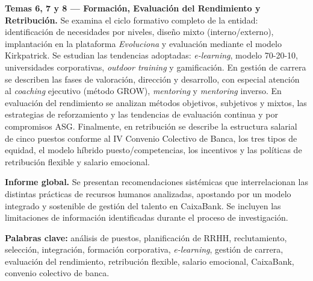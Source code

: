\textbf{Temas 6, 7 y 8 — Formación, Evaluación del Rendimiento y Retribución.}
Se examina el ciclo formativo completo de la entidad: identificación de necesidades
por niveles, diseño mixto (interno/externo), implantación en la plataforma
\textit{Evoluciona} y evaluación mediante el modelo Kirkpatrick. Se estudian
las tendencias adoptadas: \textit{e-learning}, modelo 70-20-10, universidades
corporativas, \textit{outdoor training} y gamificación. En gestión de carrera se
describen las fases de valoración, dirección y desarrollo, con especial atención
al \textit{coaching} ejecutivo (método GROW), \textit{mentoring} y \textit{mentoring}
inverso. En evaluación del rendimiento se analizan métodos objetivos, subjetivos y
mixtos, las estrategias de reforzamiento y las tendencias de evaluación continua y
por compromisos ASG. Finalmente, en retribución se describe la estructura salarial
de cinco puestos conforme al IV Convenio Colectivo de Banca, los tres tipos de
equidad, el modelo híbrido puesto/competencias, los incentivos y las políticas
de retribución flexible y salario emocional.

\medskip

\textbf{Informe global.}
Se presentan recomendaciones sistémicas que interrelacionan las distintas prácticas
de recursos humanos analizadas, apostando por un modelo integrado y sostenible de
gestión del talento en CaixaBank. Se incluyen las limitaciones de información
identificadas durante el proceso de investigación.

\medskip

\textbf{Palabras clave:} análisis de puestos, planificación de RRHH, reclutamiento,
selección, integración, formación corporativa, \textit{e-learning},
gestión de carrera, evaluación del rendimiento, retribución flexible,
salario emocional, CaixaBank, convenio colectivo de banca.

\cleardoublepage
\endinput
